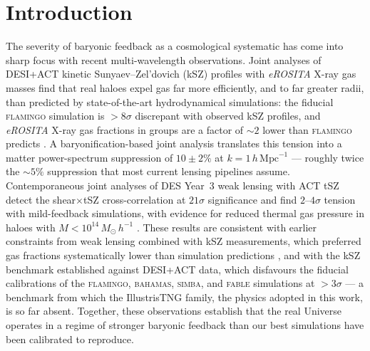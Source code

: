 \documentclass[linenumbers,trackchanges, twocolumn]{aastex701}
\begin{document}

\section{Introduction}
\label{sec:intro}

The severity of baryonic feedback as a cosmological systematic has come into
sharp focus with recent multi-wavelength observations.
Joint analyses of DESI+ACT kinetic Sunyaev--Zel'dovich (kSZ) profiles with
\textit{eROSITA} X-ray gas masses find that real haloes expel gas far more
efficiently, and to far greater radii, than predicted by state-of-the-art
hydrodynamical simulations: the fiducial \textsc{flamingo} simulation is
$>8\sigma$ discrepant with observed kSZ profiles, and \textit{eROSITA} X-ray
gas fractions in groups are a factor of $\sim2$ lower than \textsc{flamingo}
predicts \citep{Siegel-2025}.
A baryonification-based joint analysis translates this tension into a matter
power-spectrum suppression of $10\pm2\%$ at $k=1\,h\,\mathrm{Mpc}^{-1}$
\citep{Siegel-2025b} --- roughly twice the $\sim5\%$ suppression that
most current lensing pipelines assume.
Contemporaneous joint analyses of DES Year~3 weak lensing with ACT tSZ
detect the shear$\times$tSZ cross-correlation at $21\sigma$ significance and
find $2$--$4\sigma$ tension with mild-feedback simulations, with evidence for
reduced thermal gas pressure in haloes with
$M < 10^{14}\,M_{\odot}\,h^{-1}$ \citep{Pandey-2025}.
These results are consistent with earlier constraints from weak lensing combined
with kSZ measurements, which preferred gas fractions systematically lower than
simulation predictions \citep{Hadzhiyska-2024,Bigwood-2024,Amon-2022},
and with the kSZ benchmark established against DESI+ACT data, which disfavours
the fiducial calibrations of the \textsc{flamingo}, \textsc{bahamas},
\textsc{simba}, and \textsc{fable} simulations at $>3\sigma$
\citep{Bigwood-2025,McCarthy-2024} --- a benchmark from which the IllustrisTNG
family, the physics adopted in this work, is so far absent.
Together, these observations establish that the real Universe operates in a
regime of stronger baryonic feedback than our best simulations have been
calibrated to reproduce.
\end{document}
